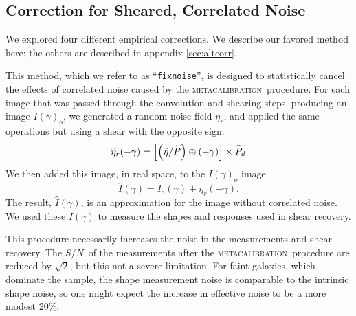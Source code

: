 \documentclass[iop]{emulateapj}
\newcommand{\snr}{$S/N$}
\newcommand{\mcal}{\textsc{metacalibration}}
\newcommand{\ntil}{\mbox{$\widetilde{\eta}$}}
\newcommand{\Ptil}{\mbox{$\widetilde{P}$}}
\newcommand{\Ptild}{\mbox{$\widetilde{P_d}$}}
\newcommand{\fixnoise}{\texttt{fixnoise}}
\begin{document}


\subsection{Correction for Sheared, Correlated Noise} \label{sec:fixnoise}


We explored four different empirical corrections.  We describe our favored
method here; the others are described in appendix \ref{sec:altcorr}.

This method, which we refer to as ``\fixnoise'', is designed to statistically
cancel the effects of correlated noise caused by the \mcal\ procedure.  For each
image that was passed through the convolution and shearing steps, producing
an image $I(\gamma)_o$, we generated a random noise field
$\eta_r$, and applied the same operations but using a shear with
the opposite sign:
\begin{equation}
    \widetilde{\eta}_r(-\gamma) = \left[ \left( \ntil/\Ptil \right) \oplus (-\gamma) \right] \times \Ptild  \nonumber \\
\end{equation}
We then added this image, in real space, to the $I(\gamma)_o$ image
\begin{equation}
    \hat{I}(\gamma) = I_o(\gamma) + \eta_r(-\gamma).
\end{equation}
The result, $\hat{I}(\gamma)$, is an approximation for the image
without correlated noise.
We used these $\hat{I}(\gamma)$ to measure the shapes and responses used in
shear recovery.  

This procedure necessarily increases the noise in the measurements and shear
recovery.  The \snr\ of the measurements after the \mcal\ procedure are reduced
by $\sqrt{2}$, but this not a severe limitation.  For faint galaxies, which
dominate the sample, the shape measurement noise is comparable to the intrinsic
shape noise, so one might expect the increase in effective noise to be a more
modest 20\%.
\end{document}
